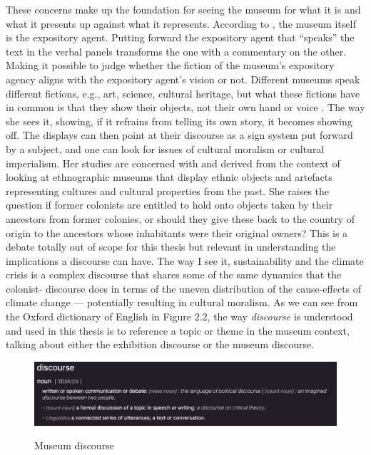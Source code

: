 These concerns make up the foundation for seeing the museum for what it is and what it presents up against what it represents. According to \autocite{Miekebal_book}, the museum itself is the expository agent. Putting forward the expository agent that “speaks” the text in the verbal panels transforms the one with a commentary on the other. Making it possible to judge whether the fiction of the museum's expository agency aligns with the expository agent's vision or not. Different museums speak different fictions, e.g., art, science, cultural heritage, but what these fictions have in common is that they show their objects, not their own hand or voice \autocite{Miekebal_book}. The way she sees it, showing, if it refrains from telling its own story, it becomes showing off. The displays can then point at their discourse as a sign system put forward by a subject, and one can look for issues of cultural moralism or cultural imperialism. Her studies are concerned with and derived from the context of looking at ethnographic museums that display ethnic objects and artefacts representing cultures and cultural properties from the past. She raises the question if former colonists are entitled to hold onto objects taken by their ancestors from former colonies, or should they give these back to the country of origin to the ancestors whose inhabitants were their original owners? This is a debate totally out of scope for this thesis but relevant in understanding the implications a discourse can have. The way I see it, sustainability and the climate crisis is a complex discourse that shares some of the same dynamics that the colonist- discourse does in terms of the uneven distribution of the cause-effects of climate change — potentially resulting in cultural moralism. As we can see from the Oxford dictionary of English in Figure 2.2, the way \emph{discourse} is understood and used in this thesis is to reference a topic or theme in the museum context, talking about either the exhibition discourse or the museum discourse.

\begin{figure}[H]
\centering
\includegraphics[width=12cm]{pictures/background/discourse.png}
\caption{Museum discourse}{\autocite{Oxford_dictionary}}
\end{figure}
 

